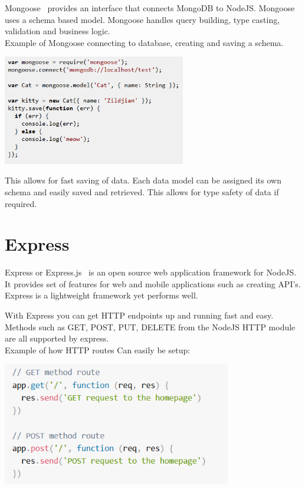 Mongoose~\cite{Mongoose} provides an interface that connects MongoDB to NodeJS. Mongoose uses a schema based model. Mongoose handles query building, type casting, validation and business logic. \\

Example of Mongoose connecting to database, creating and saving a schema.

\begin{center}    
    \includegraphics[width=80mm]{img/Mongoose.png}
\end{center}

This allows for fast saving of data. Each data model can be assigned its own schema and easily saved and retrieved. This allows for type safety of data if required.





\section{Express}
Express or Express.js~\cite{Express} is an open source web application framework for NodeJS. It provides set of features for web and mobile applications such as creating API’s. Express is a lightweight framework yet performs well. 

With Express you can get HTTP endpoints up and running fast and easy. Methods such as GET, POST, PUT, DELETE from the NodeJS HTTP module are all supported by express. \\

Example of how HTTP routes Can easily be setup:
\begin{center}    
    \includegraphics[width=100mm]{img/API.png}
\end{center}

